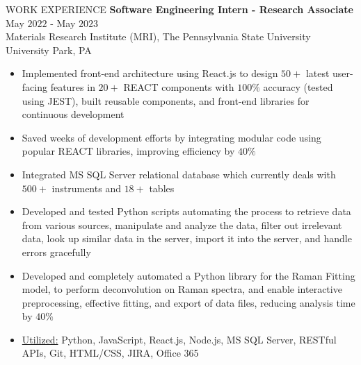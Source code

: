\documentclass{resume} %
\begin{document}
\begin{rSection}{WORK EXPERIENCE}
\textbf{Software Engineering Intern - Research Associate} \hfill May $2022$ - May $2023$\\
Materials Research Institute (MRI), The Pennsylvania State University \hfill University Park, PA
 \begin{itemize}[itemsep = -4pt]
     \item Implemented front-end architecture using React.js to design $50+$ latest user-facing features in $20+$ REACT components with $100\%$ accuracy (tested using JEST), built reusable components, and front-end libraries for continuous development
     \item Saved weeks of development efforts by integrating modular code using popular REACT libraries, improving efficiency by $40\%$
     \item Integrated MS SQL Server relational database which currently deals with $500+$ instruments and $18+$ tables
     \item Developed and tested Python scripts automating the process to retrieve data from various sources, manipulate and analyze the data, filter out irrelevant data, look up similar data in the server, import it into the server, and handle errors gracefully
     \item Developed and completely automated a Python library for the Raman Fitting model, to perform deconvolution on Raman spectra, and enable interactive preprocessing, effective fitting, and export of data files, reducing analysis time by $40\%$
     \item \underline{Utilized:} Python, JavaScript, React.js, Node.js, MS SQL Server, RESTful APIs, Git, HTML/CSS, JIRA, Office 365
    \end{itemize}

\end{rSection} 


\end{document}
